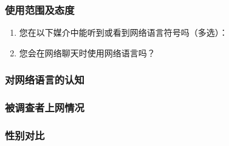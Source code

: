 \subsubsection{使用范围及态度}

\begin{enumerate}
\item 您在以下媒介中能听到或看到网络语言符号吗（多选）：
  \\
\item 您会在网络聊天时使用网络语言吗？
  \\
\end{enumerate}

\subsubsection{对网络语言的认知}



\subsubsection{被调查者上网情况}



\subsubsection{性别对比}


